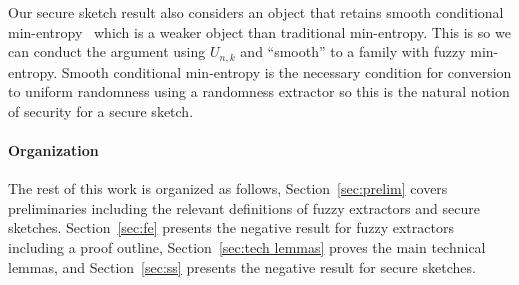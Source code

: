 Our secure sketch result also considers an object that retains smooth conditional min-entropy~\cite{renner2005simple} which is a weaker object than traditional min-entropy.  This is so we can conduct the argument using $U_{n,k}$ and ``smooth'' to a family with fuzzy min-entropy. Smooth conditional min-entropy is the necessary condition for conversion to uniform randomness using a randomness extractor so this is the natural notion of security for a secure sketch.



\paragraph{Organization} The rest of this work is organized as follows, Section~\ref{sec:prelim} covers preliminaries including the relevant definitions of fuzzy extractors and secure sketches.  Section~\ref{sec:fe} presents the negative result for fuzzy extractors including a proof outline, Section~\ref{sec:tech lemmas} proves the main technical lemmas, and Section~\ref{sec:ss} presents the negative result for secure sketches.